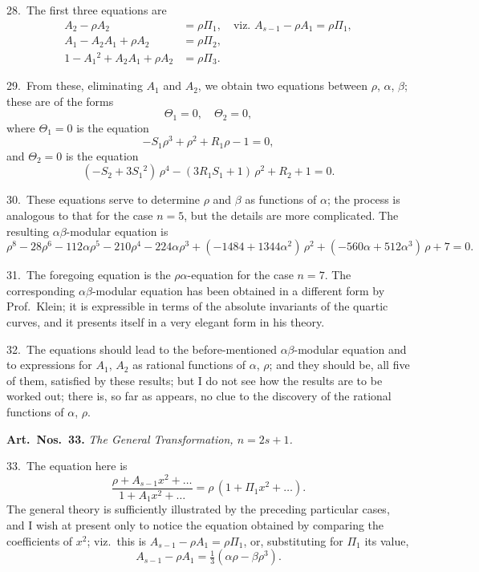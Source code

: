 \documentclass[11pt,a4paper]{book}
\begin{document}
28.\ The first three equations are
\begin{align*}
A_2 - \rho A_2 &= \rho \Pi_1, \quad \text{viz. } A_{s-1} - \rho A_1 = \rho \Pi_1,\\
A_1 - A_2 A_1 + \rho A_2 &= \rho \Pi_2, \\
1 - A_1{}^2 + A_2 A_1 + \rho A_2 &= \rho \Pi_3.
\end{align*}

29.\ From these, eliminating $A_1$ and $A_2$, we obtain two equations between $\rho$, $\alpha$, $\beta$;
these are of the forms
\[
\Theta_1 = 0, \quad \Theta_2 = 0,
\]
where $\Theta_1 = 0$ is the equation
\[
-S_1 \rho^3 + \rho^2 + R_1 \rho - 1 = 0,
\]
and $\Theta_2 = 0$ is the equation
\[
(-S_2 + 3S_1{}^2)\, \rho^4 - (3R_1 S_1 + 1)\, \rho^2 + R_2 + 1 = 0.
\]

30.\ These equations serve to determine $\rho$ and $\beta$ as functions of $\alpha$; the process is
analogous to that for the case $n = 5$, but the details are more complicated. The resulting
$\alpha\beta$-modular equation is
\[
\rho^8 - 28\rho^6 - 112\alpha \rho^5 - 210\rho^4 - 224\alpha \rho^3
+ (-1484 + 1344\alpha^2)\, \rho^2 + (-560\alpha + 512\alpha^3)\, \rho + 7 = 0.
\]

31.\ The foregoing equation is the $\rho\alpha$-equation for the case $n = 7$. The corresponding
$\alpha\beta$-modular equation has been obtained in a different form by Prof.\ Klein; it is
expressible in terms of the absolute invariants of the quartic curves, and it presents
itself in a very elegant form in his theory.

32.\ The equations should lead to the before-mentioned $\alpha\beta$-modular equation
and to expressions for $A_1$, $A_2$ as rational functions of $\alpha$, $\rho$; and they should be, all
five of them, satisfied by these results; but I do not see how the results are to be
worked out; there is, so far as appears, no clue to the discovery of the rational
functions of $\alpha$, $\rho$.

\newpage
\noindent\textbf{Art.\ Nos.\ 33.} \textit{The General Transformation, $n = 2s + 1$.}

33.\ The equation here is
\[
\frac{\rho + A_{s-1} x^2 + \ldots}{1 + A_1 x^2 + \ldots} = \rho\, (1 + \Pi_1 x^2 + \ldots).
\]
The general theory is sufficiently illustrated by the preceding particular cases, and I
wish at present only to notice the equation obtained by comparing the coefficients of
$x^2$; viz.\ this is $A_{s-1} - \rho A_1 = \rho \Pi_1$, or, substituting for $\Pi_1$ its value,
\[
A_{s-1} - \rho A_1 = \tfrac13(\alpha \rho - \beta \rho^3).
\]
\end{document}

